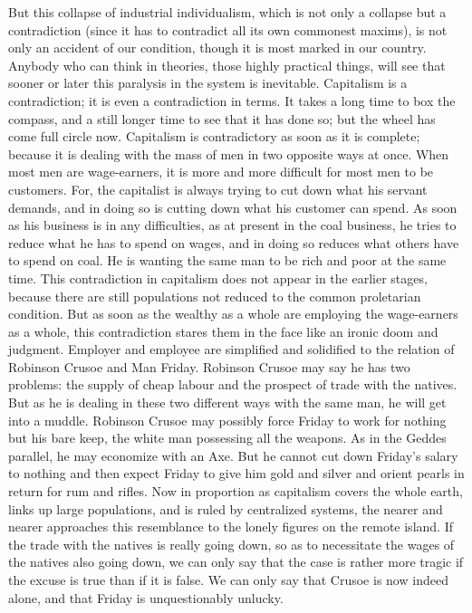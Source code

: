 \documentclass{book}
\begin{document}
But this collapse of industrial individualism, which is not only a collapse but a contradiction (since it has to contradict all its own commonest maxims), is not only an accident of our condition, though it is most marked in our country. Anybody who can think in theories, those highly practical things, will see that sooner or later this paralysis in the system is inevitable. Capitalism is a contradiction; it is even a contradiction in terms. It takes a long time to box the compass, and a still longer time to see that it has done so; but the wheel has come full circle now. Capitalism is contradictory as soon as it is complete; because it is dealing with the mass of men in two opposite ways at once. When most men are wage-earners, it is more and more difficult for most men to be customers. For, the capitalist is always trying to cut down what his servant demands, and in doing so is cutting down what his customer can spend. As soon as his business is in any difficulties, as at present in the coal business, he tries to reduce what he has to spend on wages, and in doing so reduces what others have to spend on coal. He is wanting the same man to be rich and poor at the same time. This contradiction in capitalism does not appear in the earlier stages, because there are still populations not reduced to the common proletarian condition. But as soon as the wealthy as a whole are employing the wage-earners as a whole, this contradiction stares them in the face like an ironic doom and judgment. Employer and employee are simplified and solidified to the relation of Robinson Crusoe and Man Friday. Robinson Crusoe may say he has two problems: the supply of cheap labour and the prospect of trade with the natives. But as he is dealing in these two different ways with the same man, he will get into a muddle. Robinson Crusoe may possibly force Friday to work for nothing but his bare keep, the white man possessing all the weapons. As in the Geddes parallel, he may economize with an Axe. But he cannot cut down Friday’s salary to nothing and then expect Friday to give him gold and silver and orient pearls in return for rum and rifles. Now in proportion as capitalism covers the whole earth, links up large populations, and is ruled by centralized systems, the nearer and nearer approaches this resemblance to the lonely figures on the remote island. If the trade with the natives is really going down, so as to necessitate the wages of the natives also going down, we can only say that the case is rather more tragic if the excuse is true than if it is false. We can only say that Crusoe is now indeed alone, and that Friday is unquestionably unlucky.
\end{document}
